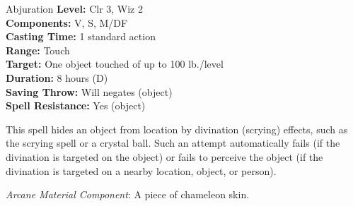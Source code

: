 {Abjuration}
{
	\textbf{Level:}
	Clr 3, Wiz 2\\
	\textbf{Components:}
	V, S, M/DF\\
	\textbf{Casting Time:}
	1 standard action\\
	\textbf{Range:}
	Touch\\
	\textbf{Target:}
	One object touched of up to 100 lb./level\\
	\textbf{Duration:}
	8 hours (D)\\
	\textbf{Saving Throw:}
	Will negates (object)\\
	\textbf{Spell Resistance:}
	Yes (object)\\
}
{
	This spell hides an object from location by divination (scrying) effects, such as the scrying spell or a crystal ball. Such an attempt automatically fails (if the divination is targeted on the object) or fails to perceive the object (if the divination is targeted on a nearby location, object, or person).

	\textit{Arcane Material Component}:
	A piece of chameleon skin.

}
